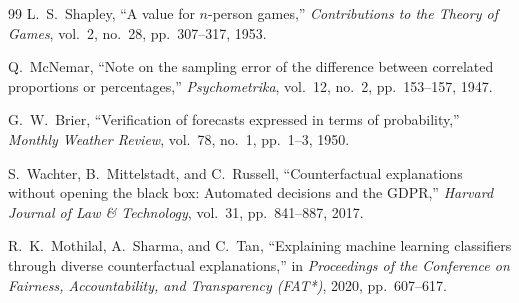 \documentclass[12pt,a4paper]{report}
\begin{document}
\begin{thebibliography}{99}
L.~S.~Shapley, ``A value for $n$-person games,'' \emph{Contributions to the Theory of Games}, vol.~2, no.~28, pp.~307--317, 1953.

Q.~McNemar, ``Note on the sampling error of the difference between correlated proportions or percentages,'' \emph{Psychometrika}, vol.~12, no.~2, pp.~153--157, 1947.

G.~W.~Brier, ``Verification of forecasts expressed in terms of probability,'' \emph{Monthly Weather Review}, vol.~78, no.~1, pp.~1--3, 1950.

S.~Wachter, B.~Mittelstadt, and C.~Russell, ``Counterfactual explanations without opening the black box: Automated decisions and the GDPR,'' \emph{Harvard Journal of Law \& Technology}, vol.~31, pp.~841--887, 2017.

R.~K.~Mothilal, A.~Sharma, and C.~Tan, ``Explaining machine learning classifiers through diverse counterfactual explanations,'' in \emph{Proceedings of the Conference on Fairness, Accountability, and Transparency (FAT*)}, 2020, pp.~607--617.

\end{thebibliography}
\end{document}
